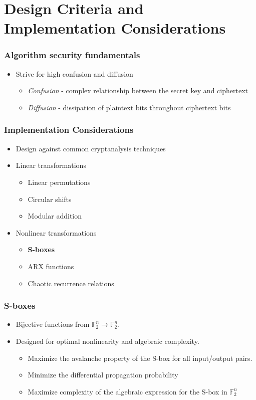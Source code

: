\documentclass[handout]{beamer}
\newcommand{\field}[1]{\mathbb{#1}} %
\begin{document}
\section{Design Criteria and Implementation Considerations}
\begin{frame}
	\frametitle{Algorithm security fundamentals}
	\begin{itemize}
		\item Strive for high confusion and diffusion
		\begin{itemize}
			\item \emph{Confusion} - complex relationship between the secret key and ciphertext
			\item \emph{Diffusion} - dissipation of plaintext bits throughout ciphertext bits
		\end{itemize}
	\end{itemize}
\end{frame}

\begin{frame}
	\frametitle{Implementation Considerations}
	\begin{itemize}
		\item Design against common cryptanalysis techniques
		\item Linear transformations
		\begin{itemize}
			\item Linear permutations
			\item Circular shifts
			\item Modular addition
		\end{itemize}
		\item Nonlinear transformations 
		\begin{itemize}
			\item \textbf{S-boxes}
			\item ARX functions
			\item Chaotic recurrence relations
		\end{itemize}
	\end{itemize}
\end{frame}

\begin{frame}
	\frametitle{S-boxes}
	\begin{itemize}
		\item Bijective functions from $\field{F}_2^n \to \field{F}_2^n$.
		\item Designed for optimal nonlinearity and algebraic complexity.
		\begin{itemize}
			\item Maximize the avalanche property of the S-box for all input/output pairs.
			\item Minimize the differential propagation probability %
			\item Maximize complexity of the algebraic expression for the S-box in $\field{F}_2^n$
		\end{itemize}
	\end{itemize}
\end{frame}
\end{document}
